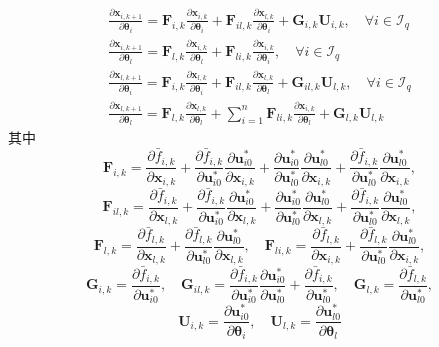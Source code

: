 \documentclass[lang=chs, degree=master, blindreview=false, winfonts=true]{yanputhesis}
\begin{document}
\begin{equation}
	\begin{gathered}
		\frac{\partial \bm{x}_{i,k+1}}{\partial \bm{\theta}_i} = \bm{F}_{i,k} \frac{\partial \bm{x}_{i,k}}{\partial \bm{\theta}_i} + \bm{F}_{il,k} \frac{\partial \bm{x}_{l,k}}{\partial \bm{\theta}_i} + \bm{G}_{i,k} \bm{U}_{i,k}, \quad \forall i \in \mathcal{I}_q 
		\\
		\frac{\partial \bm{x}_{i,k+1}}{\partial \bm{\theta}_l} = \bm{F}_{l,k} \frac{\partial \bm{x}_{i,k}}{\partial \bm{\theta}_l} + \bm{F}_{li,k} \frac{\partial \bm{x}_{i,k}}{\partial \bm{\theta}_i}, \quad \forall i \in \mathcal{I}_q
		\\
		\frac{\partial \bm{x}_{l,k+1}}{\partial \bm{\theta}_i} = \bm{F}_{i,k} \frac{\partial \bm{x}_{l,k}}{\partial \bm{\theta}_i} + \bm{F}_{il,k} \frac{\partial \bm{x}_{l,k}}{\partial \bm{\theta}_l} + \bm{G}_{il,k} \bm{U}_{l,k}, \quad \forall i \in \mathcal{I}_q
		\\
		\frac{\partial \bm{x}_{l,k+1}}{\partial \bm{\theta}_l} = \bm{F}_{l,k} \frac{\partial \bm{x}_{l,k}}{\partial \bm{\theta}_l} + \sum_{i=1}^{n} \bm{F}_{li,k} \frac{\partial \bm{x}_{i,k}}{\partial \bm{\theta}_l} + \bm{G}_{l,k} \bm{U}_{l,k}
	\end{gathered}
	\label{ss}      
\end{equation}
其中
$$
\bm{F}_{i,k} = \frac{\partial \bar{f}_{i,k}}{\partial \bm{x}_{i,k}} + \frac{\partial \bar{f}_{i,k}}{\partial \bm{u}_{i0}^*} \frac{\partial \bm{u}_{i0}^*}{\partial \bm{x}_{i,k}} + \frac{\partial \bm{u}_{i0}^*}{\partial \bm{u}_{l0}^*} \frac{\partial \bm{u}_{l0}^*}{\partial \bm{x}_{i,k}} + \frac{\partial \bar{f}_{i,k}}{\partial \bm{u}_{l0}^*} \frac{\partial \bm{u}_{l0}^*}{\partial \bm{x}_{i,k}},$$
$$\bm{F}_{il,k} = \frac{\partial \bar{f}_{i,k}}{\partial \bm{x}_{l,k}} + \frac{\partial \bar{f}_{i,k}}{\partial \bm{u}_{i0}^*} \frac{\partial \bm{u}_{i0}^*}{\partial \bm{x}_{l,k}} + \frac{\partial \bm{u}_{i0}^*}{\partial \bm{u}_{l0}^*} \frac{\partial \bm{u}_{l0}^*}{\partial \bm{x}_{l,k}} + \frac{\partial \bar{f}_{i,k}}{\partial \bm{u}_{l0}^*} \frac{\partial \bm{u}_{l0}^*}{\partial \bm{x}_{l,k}},$$
$$\bm{F}_{l,k} = \frac{\partial \bar{f}_{l,k}}{\partial \bm{x}_{l,k}} + \frac{\partial \bar{f}_{l,k}}{\partial \bm{u}_{l0}^*} \frac{\partial \bm{u}_{l0}^*}{\partial \bm{x}_{l,k}}
, \quad \bm{F}_{li,k} = \frac{\partial \bar{f}_{l,k}}{\partial \bm{x}_{i,k}} + \frac{\partial \bar{f}_{l,k}}{\partial \bm{u}_{l0}^*} \frac{\partial \bm{u}_{l0}^*}{\partial \bm{x}_{i,k}},$$
$$\bm{G}_{i,k} = \frac{\partial \bar{f}_{i,k}}{\partial \bm{u}_{i0}^*}
, \quad \bm{G}_{il,k} = \frac{\partial \bar{f}_{i,k}}{\partial \bm{u}_{i0}^*} \frac{\partial \bm{u}_{i0}^*}{\partial \bm{u}_{l0}^*} + \frac{\partial \bar{f}_{i,k}}{\partial \bm{u}_{l0}^*}
, \quad \bm{G}_{l,k} = \frac{\partial \bar{f}_{l,k}}{\partial \bm{u}_{l0}^*},$$
$$\bm{U}_{i,k} = \frac{\partial \bm{u}_{i0}^*}{\partial \bm{\theta}_i}, \quad \bm{U}_{l,k} = \frac{\partial \bm{u}_{l0}^*}{\partial \bm{\theta}_l}$$
\end{document}
